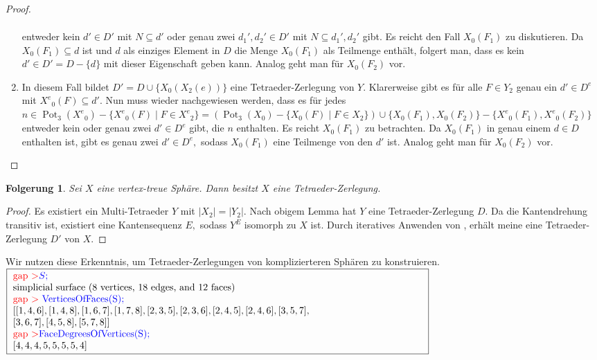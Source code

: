 \documentclass[12pt,titlepage,twoside,cleardoublepage]{article}
\theoremstyle{nummermitklammern}
\newtheorem{folgerung}[temp]{Folgerung}
\newtheorem{bsp}[temp]{Beispiel}
\newtheorem{folgerung}[zahl]{Folgerung}
\newtheorem{bsp}[zahl]{Beispiel}
\numberwithin{equation}{section}
\DeclareMathOperator{\Pot}{Pot}
\begin{document}
\begin{proof}
\begin{enumerate}
\begin{align*}
 \end{align*}
  entweder kein $d'\in D'$ mit $N\subseteq d'$ 
  oder genau zwei $d_1',d_2'\in D'$ mit $N\subseteq d_1',d_2'$ gibt. 
  Es reicht den Fall $X_0(F_1)$ zu diskutieren. Da $X_0(F_1)\subseteq d$ ist und $d$ als einziges Element in $D$ die Menge $X_0(F_1)$ als Teilmenge enthält, folgert man, dass es kein $d'\in D'=D-\{d\}$ mit dieser Eigenschaft geben kann. Analog geht man für $X_0(F_2) $ vor.
\item In diesem Fall bildet $D'=D\cup\{X_0(X_2(e))\}$ eine Tetraeder-Zerlegung von $Y.$ Klarerweise gibt es für alle $F\in {Y}_2$ genau ein $d'\in D^e$ mit ${X^e}_0(F)\subseteq d'.$ Nun muss wieder nachgewiesen werden, dass es für jedes $n\in \Pot_3({X^e}_0)-\{{X^e}_0(F)\mid F\in {X^e}_2\}=(\Pot_3({X}_0)-\{{X}_0(F)\mid F\in {X}_2\})\cup \{X_0(F_1),X_0(F_2)\}-\{{X^e}_0(F_1),{X^e}_0(F_2)\}$ entweder kein oder genau zwei $d'\in D^e$ gibt, die $n$ enthalten. Es reicht $X_0(F_1)$ zu betrachten. Da $X_0(F_1)$ in genau einem $d\in D$ enthalten ist, gibt es genau zwei $d'\in D^e,$ sodass $X_0(F_1)$ eine Teilmenge von den $d'$ ist. Analog geht man für $X_0(F_2) $ vor.
\end{enumerate}
\end{proof}
\begin{folgerung}
Sei $X$ eine vertex-treue Sphäre. Dann besitzt $X$ eine Tetraeder-Zerlegung.
\end{folgerung}
\begin{proof}
Es existiert ein Multi-Tetraeder $Y$ mit $\vert X_2\vert =\vert Y_2 \vert .$ Nach obigem Lemma hat $Y$ eine Tetraeder-Zerlegung $D$. Da die Kantendrehung transitiv ist, existiert eine Kantensequenz $E,$ sodass $Y^E$ isomorph zu $X$ ist. Durch iteratives Anwenden von , erhält meine eine Tetraeder-Zerlegung $D'$ von $X$. 
\end{proof}
Wir nutzen diese Erkenntnis, um Tetraeder-Zerlegungen von komplizierteren Sphären zu konstruieren.\newline
$\fbox{
\parbox{15cm}{
\textcolor{red}{gap $>$}\textcolor{blue}{$S;$}\\
simplicial surface (8 vertices, 18 edges, and 12 faces)\\
\textcolor{red}{gap $>$} \textcolor{blue}{VerticesOfFaces(S);}\\
$[ [ 1, 4, 6 ], [ 1, 4, 8 ], [ 1, 6, 7 ], [ 1, 7, 8 ], [ 2, 3, 5 ],
[ 2, 3, 6 ], [ 2, 4, 5 ], [ 2, 4, 6 ], [ 3, 5, 7 ],$\newline
$ [ 3, 6, 7 ],
[ 4, 5, 8 ], [ 5, 7, 8 ] ]$\newline
\textcolor{red}{gap $>$}\textcolor{blue}{ FaceDegreesOfVertices(S);}\\
$[ 4, 4, 4, 5, 5, 5, 5, 4 ]$
 }}$\\
\end{document}
